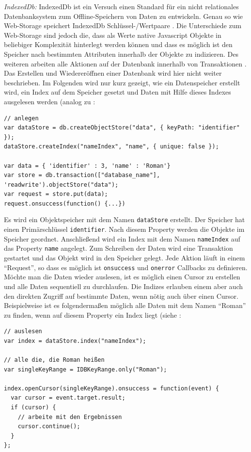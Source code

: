 \emph{IndexedDb:}
IndexedDb ist ein Versuch einen Standard für ein nicht relationales Datenbanksystem zum Offline-Speichern von Daten zu entwickeln. Genau so wie Web-Storage speichert IndexedDb Schlüssel-/Wertpaare \cite{indexeddb_api_w3c}. Die Unterschiede zum Web-Storage sind jedoch die, dass als Werte native Javascript Objekte in beliebiger Komplexität hinterlegt werden können  und dass es möglich ist den Speicher nach bestimmten Attributen innerhalb der Objekte zu indizieren. Des weiteren arbeiten alle Aktionen auf der Datenbank innerhalb von Transaktionen \cite{indexeddb_basic_concepts_mozilla}. Das Erstellen und Wiedereröffnen einer Datenbank wird hier nicht weiter beschrieben. Im Folgenden wird nur kurz gezeigt, wie ein Datenspeicher erstellt wird, ein Index auf dem Speicher gesetzt und Daten mit Hilfe dieses Indexes ausgelesen werden (analog zu \cite{html5_rocks_client_side_storage}:

\begin{lstlisting}
// anlegen
var dataStore = db.createObjectStore("data", { keyPath: "identifier" });
dataStore.createIndex("nameIndex", "name", { unique: false });

var data = { 'identifier' : 3, 'name' : 'Roman'}
var store = db.transaction(["database_name"], 'readwrite').objectStore("data");
var request = store.put(data);
request.onsuccess(function() {...})
\end{lstlisting}  
Es wird ein Objektspeicher mit dem Namen \texttt{dataStore} erstellt. Der Speicher hat einen Primärschlüssel \texttt{identifier}. Nach diesem Property werden die Objekte im Speicher geordnet. Anschließend wird ein Index mit dem Namen \texttt{nameIndex} auf das Property \texttt{name} angelegt. Zum Schreiben der Daten wird eine Transaktion gestartet und das Objekt wird in den Speicher gelegt. Jede Aktion läuft in einem "`Request"', so dass es möglich ist \texttt{onsuccess} und \texttt{onerror} Callbacks zu definieren. Möchte man die Daten wieder auslesen, ist es möglich einen Cursor zu erstellen und alle Daten sequentiell zu durchlaufen. Die Indizes erlauben einem aber auch den direkten Zugriff auf bestimmte Daten, wenn nötig auch über einen Cursor.  Beispielweise ist es folgendermaßen möglich alle Daten mit dem Namen "`Roman"' zu finden, wenn auf diesem Property ein Index liegt (siehe \cite{indexeddb_basic_concepts_mozilla}:
\begin{lstlisting}
// auslesen
var index = dataStore.index("nameIndex");

// alle die, die Roman heißen
var singleKeyRange = IDBKeyRange.only("Roman");
 
index.openCursor(singleKeyRange).onsuccess = function(event) {
  var cursor = event.target.result;
  if (cursor) {
    // arbeite mit den Ergebnissen
    cursor.continue();
  }
};
\end{lstlisting} 

